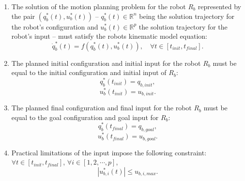\documentclass[eprint]{actapoly}
\begin{document}
\begin{enumerate}

    \item The solution of the motion planning problem
    for the robot $R_b$ represented by the pair
    $(q^{*}_b(t), u^{*}_b(t))$ --
    $q^{*}_b(t) \in \mathbb{R}^n$ being the solution trajectory for
    the robot's configuration and $u^{*}_b(t) \in \mathbb{R}^p$ the solution
    trajectory for the robot's input -- must satisfy the
    robots kinematic model equation:   
    \begin{equation}\label{eq:kinematic}
        \dot{q}^{*}_b(t) = f(q^{*}_b(t),u^{*}_b(t)),\quad \forall t \in [t_{init}, t_{final}].
    \end{equation}
    
    \item The planned initial configuration and initial 
    input for the robot $R_b$ must
    be equal to the initial configuration and initial
    input of $R_b$:
    \begin{equation}
        q^{*}_{b}(t_{init}) = q_{b,init},
    \end{equation}
    \begin{equation}
        u^{*}_{b}(t_{init}) = u_{b,init}.
    \end{equation}

    \item The planned final configuration and final 
    input for the robot $R_b$ must
    be equal to the goal configuration and goal
    input for $R_b$:
    \begin{equation}\label{eq:finalconfig}
        q^{*}_{b}(t_{final}) = q_{b,goal},
    \end{equation}
    \begin{equation}\label{eq:finalinput}
        u^{*}_{b}(t_{final}) = u_{b,goal}.
    \end{equation}

    \item Practical limitations of the input impose
    the following constraint: $\forall t \in [t_{init}, t_{final}]$, $\forall i \in [1,2,\cdots, p]$,
    \begin{equation}
        |u^{*}_{b,i}(t)| \leq u_{b,i,max}.
    \end{equation}
    

\end{enumerate}
\end{document}
